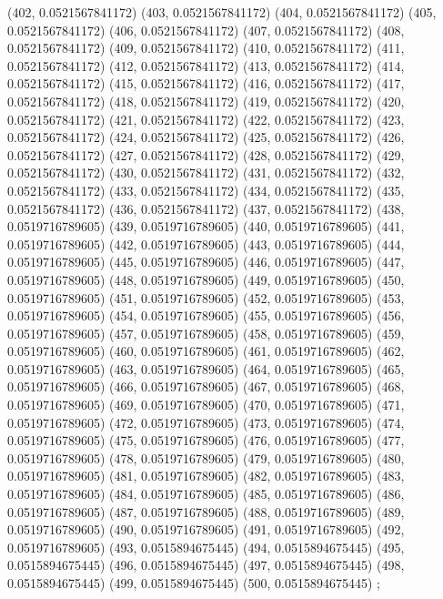 {					(402, 0.0521567841172)
					(403, 0.0521567841172)
					(404, 0.0521567841172)
					(405, 0.0521567841172)
					(406, 0.0521567841172)
					(407, 0.0521567841172)
					(408, 0.0521567841172)
					(409, 0.0521567841172)
					(410, 0.0521567841172)
					(411, 0.0521567841172)
					(412, 0.0521567841172)
					(413, 0.0521567841172)
					(414, 0.0521567841172)
					(415, 0.0521567841172)
					(416, 0.0521567841172)
					(417, 0.0521567841172)
					(418, 0.0521567841172)
					(419, 0.0521567841172)
					(420, 0.0521567841172)
					(421, 0.0521567841172)
					(422, 0.0521567841172)
					(423, 0.0521567841172)
					(424, 0.0521567841172)
					(425, 0.0521567841172)
					(426, 0.0521567841172)
					(427, 0.0521567841172)
					(428, 0.0521567841172)
					(429, 0.0521567841172)
					(430, 0.0521567841172)
					(431, 0.0521567841172)
					(432, 0.0521567841172)
					(433, 0.0521567841172)
					(434, 0.0521567841172)
					(435, 0.0521567841172)
					(436, 0.0521567841172)
					(437, 0.0521567841172)
					(438, 0.0519716789605)
					(439, 0.0519716789605)
					(440, 0.0519716789605)
					(441, 0.0519716789605)
					(442, 0.0519716789605)
					(443, 0.0519716789605)
					(444, 0.0519716789605)
					(445, 0.0519716789605)
					(446, 0.0519716789605)
					(447, 0.0519716789605)
					(448, 0.0519716789605)
					(449, 0.0519716789605)
					(450, 0.0519716789605)
					(451, 0.0519716789605)
					(452, 0.0519716789605)
					(453, 0.0519716789605)
					(454, 0.0519716789605)
					(455, 0.0519716789605)
					(456, 0.0519716789605)
					(457, 0.0519716789605)
					(458, 0.0519716789605)
					(459, 0.0519716789605)
					(460, 0.0519716789605)
					(461, 0.0519716789605)
					(462, 0.0519716789605)
					(463, 0.0519716789605)
					(464, 0.0519716789605)
					(465, 0.0519716789605)
					(466, 0.0519716789605)
					(467, 0.0519716789605)
					(468, 0.0519716789605)
					(469, 0.0519716789605)
					(470, 0.0519716789605)
					(471, 0.0519716789605)
					(472, 0.0519716789605)
					(473, 0.0519716789605)
					(474, 0.0519716789605)
					(475, 0.0519716789605)
					(476, 0.0519716789605)
					(477, 0.0519716789605)
					(478, 0.0519716789605)
					(479, 0.0519716789605)
					(480, 0.0519716789605)
					(481, 0.0519716789605)
					(482, 0.0519716789605)
					(483, 0.0519716789605)
					(484, 0.0519716789605)
					(485, 0.0519716789605)
					(486, 0.0519716789605)
					(487, 0.0519716789605)
					(488, 0.0519716789605)
					(489, 0.0519716789605)
					(490, 0.0519716789605)
					(491, 0.0519716789605)
					(492, 0.0519716789605)
					(493, 0.0515894675445)
					(494, 0.0515894675445)
					(495, 0.0515894675445)
					(496, 0.0515894675445)
					(497, 0.0515894675445)
					(498, 0.0515894675445)
					(499, 0.0515894675445)
					(500, 0.0515894675445)
				};
